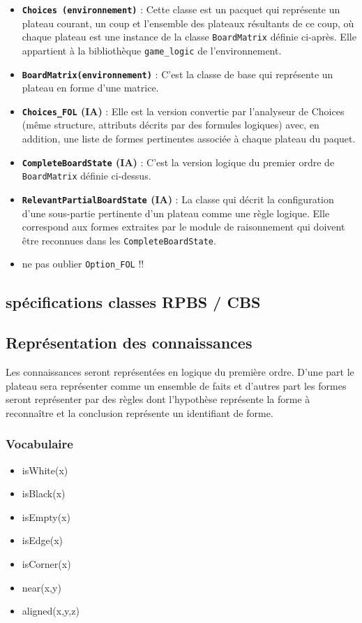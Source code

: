\begin{itemize}
  \item \textbf {\texttt{\gls{Choices} (environnement)}} : Cette classe est un pacquet qui représente un plateau courant, un coup et l'ensemble des plateaux résultants de ce coup, où chaque plateau est une instance de la classe \texttt{\gls{BoardMatrix}} définie ci-après. Elle appartient à la bibliothèque \texttt{\gls{game_logic}} de l'environnement.
  \item \textbf {\texttt{\gls{BoardMatrix}(environnement)}} : C'est la classe de base qui représente un plateau en forme d'une matrice. 
  \item \textbf {\texttt{\gls{Choices_FOL}} (IA)} : Elle est la version convertie par l'analyseur de Choices (même structure, attributs décrits par des formules logiques) avec, en addition, une liste de formes pertinentes associée à chaque plateau du paquet.
  \item \textbf {\texttt{\gls{CompleteBoardState}} (IA)} : C'est la version logique du premier ordre de
  \texttt{\gls{BoardMatrix}} définie ci-dessus.
  \item \textbf {\texttt{\gls{RelevantPartialBoardState}} (IA)} : La classe qui décrit la configuration d'une sous-partie pertinente d'un plateau comme une règle logique. Elle correspond aux \og formes \fg{} extraites par le module de raisonnement qui doivent être reconnues dans les \texttt{\gls{CompleteBoardState}}.
  \item ne pas oublier \texttt{\gls{Option_FOL}} !!
\end{itemize}

\subsection{spécifications classes RPBS / CBS}
\label{specs_shared_classes}
\subsection{Représentation des connaissances}
	Les connaissances seront représentées en logique du première ordre. D'une part le plateau sera représenter comme un ensemble de faits et d'autres part les \og formes \fg{} seront représenter par des règles dont l'hypothèse représente la forme à reconnaître et la conclusion représente un identifiant de forme.
	
	\subsubsection{Vocabulaire} 
	\begin{itemize}
	\item isWhite(x)
  \item isBlack(x)
  \item isEmpty(x)
  \item isEdge(x)
  \item isCorner(x)
  \item near(x,y)
  \item aligned(x,y,z)
	\end{itemize}

\label{specs_voc_fol}